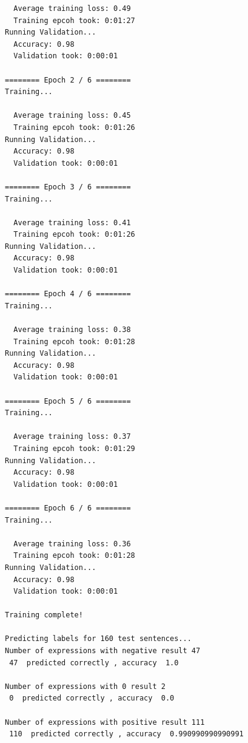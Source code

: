 \documentclass{article}
\begin{document}
\begin{lstlisting}
  Average training loss: 0.49
  Training epcoh took: 0:01:27
Running Validation...
  Accuracy: 0.98
  Validation took: 0:00:01

======== Epoch 2 / 6 ========
Training...

  Average training loss: 0.45
  Training epcoh took: 0:01:26
Running Validation...
  Accuracy: 0.98
  Validation took: 0:00:01

======== Epoch 3 / 6 ========
Training...

  Average training loss: 0.41
  Training epcoh took: 0:01:26
Running Validation...
  Accuracy: 0.98
  Validation took: 0:00:01

======== Epoch 4 / 6 ========
Training...

  Average training loss: 0.38
  Training epcoh took: 0:01:28
Running Validation...
  Accuracy: 0.98
  Validation took: 0:00:01

======== Epoch 5 / 6 ========
Training...

  Average training loss: 0.37
  Training epcoh took: 0:01:29
Running Validation...
  Accuracy: 0.98
  Validation took: 0:00:01

======== Epoch 6 / 6 ========
Training...

  Average training loss: 0.36
  Training epcoh took: 0:01:28
Running Validation...
  Accuracy: 0.98
  Validation took: 0:00:01

Training complete!

Predicting labels for 160 test sentences...
Number of expressions with negative result 47 
 47  predicted correctly , accuracy  1.0 

Number of expressions with 0 result 2 
 0  predicted correctly , accuracy  0.0 

Number of expressions with positive result 111 
 110  predicted correctly , accuracy  0.990990990990991
\end{lstlisting}
\end{document}
